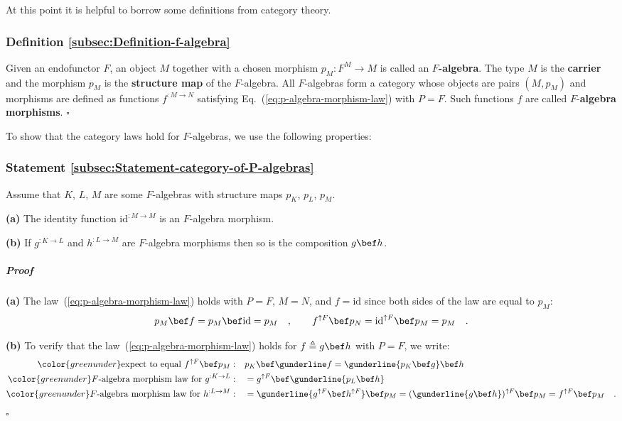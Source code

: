 At this point it is helpful to borrow some definitions from category
theory. 

\subsubsection{Definition \label{subsec:Definition-f-algebra}\ref{subsec:Definition-f-algebra}}

Given an endofunctor $F$, an object $M$ together with a chosen morphism
$p_{M}:F^{M}\rightarrow M$ is called an $F$\textbf{-algebra}. The
type $M$ is the \textbf{carrier} and the morphism $p_{M}$ is the
\textbf{structure map} of the
$F$-algebra.  All $F$-algebras
form a category whose objects are pairs $\left(M,p_{M}\right)$ and
morphisms are defined as functions $f^{:M\rightarrow N}$ satisfying
Eq.~(\ref{eq:p-algebra-morphism-law}) with $P=F$. Such functions
$f$ are called $F$-\textbf{algebra morphisms}.
$\square$

To show that the category laws hold for $F$-algebras, we use the
following properties:

\subsubsection{Statement \label{subsec:Statement-category-of-P-algebras}\ref{subsec:Statement-category-of-P-algebras}}

Assume that $K$, $L$, $M$ are some $F$-algebras with structure
maps $p_{K}$, $p_{L}$, $p_{M}$.

\textbf{(a)} The identity function $\text{id}^{:M\rightarrow M}$
is an $F$-algebra morphism.

\textbf{(b)} If $g^{:K\rightarrow L}$ and $h^{:L\rightarrow M}$
are $F$-algebra morphisms then so is the composition $g\bef h$.

\subparagraph{Proof}

\textbf{(a)} The law~(\ref{eq:p-algebra-morphism-law}) holds with
$P=F$, $M=N$, and $f=\text{id}$ since both sides of the law are
equal to $p_{M}$:
\[
p_{M}\bef f=p_{M}\bef\text{id}=p_{M}\quad,\quad\quad f^{\uparrow F}\bef p_{N}=\text{id}^{\uparrow F}\bef p_{M}=p_{M}\quad.
\]

\textbf{(b)} To verify that the law~(\ref{eq:p-algebra-morphism-law})
holds for $f\triangleq g\bef h$ with $P=F$, we write:
\begin{align*}
{\color{greenunder}\text{expect to equal }f^{\uparrow F}\bef p_{M}:}\quad & p_{K}\bef\gunderline f=\gunderline{p_{K}\bef g}\bef h\\
{\color{greenunder}F\text{-algebra morphism law for }g^{:K\rightarrow L}:}\quad & =g^{\uparrow F}\bef\gunderline{p_{L}\bef h}\\
{\color{greenunder}F\text{-algebra morphism law for }h^{:L\rightarrow M}:}\quad & =\gunderline{g^{\uparrow F}\bef h^{\uparrow F}}\bef p_{M}=(\gunderline{g\bef h})^{\uparrow F}\bef p_{M}=f^{\uparrow F}\bef p_{M}\quad.
\end{align*}
$\square$

